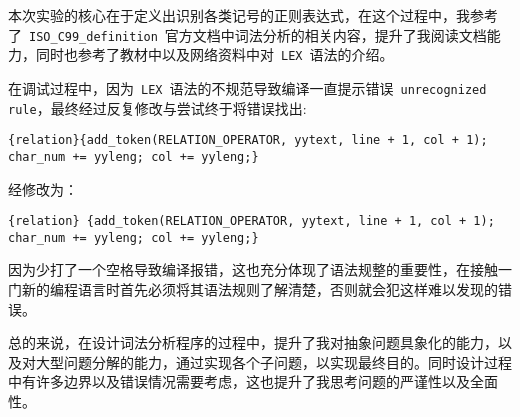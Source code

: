 \documentclass[lang=cn,11pt,a4paper]{paper}
\begin{document}
本次实验的核心在于定义出识别各类记号的正则表达式，在这个过程中，我参考了\ \lstinline{ISO_C99_definition}\ 官方文档中词法分析的相关内容，提升了我阅读文档能力，同时也参考了教材中以及网络资料中对\ \lstinline{LEX}\ 语法的介绍。

在调试过程中，因为\ \lstinline{LEX}\ 语法的不规范导致编译一直提示错误\ \lstinline{unrecognized rule}，最终经过反复修改与尝试终于将错误找出:

\begin{lstlisting}
{relation}{add_token(RELATION_OPERATOR, yytext, line + 1, col + 1); char_num += yyleng; col += yyleng;}
\end{lstlisting}

经修改为：

\begin{lstlisting}
{relation} {add_token(RELATION_OPERATOR, yytext, line + 1, col + 1); char_num += yyleng; col += yyleng;}    
\end{lstlisting}

因为少打了一个空格导致编译报错，这也充分体现了语法规整的重要性，在接触一门新的编程语言时首先必须将其语法规则了解清楚，否则就会犯这样难以发现的错误。

总的来说，在设计词法分析程序的过程中，提升了我对抽象问题具象化的能力，以及对大型问题分解的能力，通过实现各个子问题，以实现最终目的。同时设计过程中有许多边界以及错误情况需要考虑，这也提升了我思考问题的严谨性以及全面性。
\end{document}
